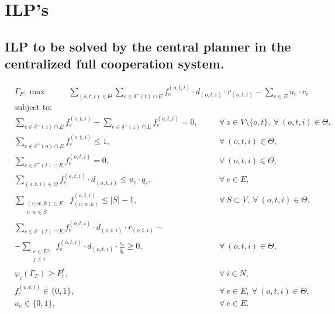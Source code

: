 \documentclass[review]{elsarticle}
\begin{document}


\appendix
\section{ILP's}
\label{seq:appendixilp}

\subsection{ILP to be solved by the central planner in the centralized full cooperation system.}

    \begin{align}
        &  \Gamma_F: \max  & \hspace{22pt} \sum_{(o,t,i)\in \Theta} \sum_{e \in \delta^-(t)\cap E}  f_e^{(o,t,i)} \cdot d_{(o,t,i)} \cdot r_{(o,t,i)} - \sum_{e\in E} u_{e}\cdot c_{e} \hspace{40pt} && 
    \end{align}
    \begin{align}
        & \text{subject to:}       && \nonumber \\
        & \sum_{e \in \delta^-(z)\cap E} f_e^{(o,t,i)} -\sum_{e \in \delta^+(z)\cap E} f_{e}^{(o,t,i)} = 0,\quad && \forall\ z\in V\setminus\{o,t\},\ \forall\ (o,t,i)\in\Theta, \\
& \sum_{e \in \delta^+(o)\cap E} f_e^{(o,t,i)} \leq 1, && \forall\ (o,t,i)\in \Theta, \\
 & \sum_{e \in \delta^+(t)\cap E} f_e^{(o,t,i)} = 0,  && \forall\ (o,t,i)\in \Theta,  \\
& \sum_{(o,t,i) \in \Theta} f_e^{(o,t,i)}\cdot d_{(o,t,i)}  \leq u_e\cdot q_e, && \forall\ e \in E,   \\
 & \sum_{\substack{(v,w,k) \in E\colon \\ v,w \in S}} f_{(v,w,k)}^{(o,t,i)} \leq |S| -1, && \forall\ S \subset V,\ \forall\ (o,t,i) \in \Theta,\\
&\sum_{e \in \delta^-(t)\cap E}  f_e^{(o,t,i)}  \cdot d_{(o,t,i)} \cdot r_{(o,t,i)} - && \nonumber\\
& -\sum_{\substack{e \in E^j\colon \\ j\not = i}} f_e^{(o,t,i)} \cdot d_{(o,t,i)} \cdot \frac{c_e}{q_e}\geq 0, && \forall\ (o,t,i) \in \Theta, \\
& \varphi_i(\Gamma_F) \geq P_i^*,  && \forall\ i\in N, \\
& f_e^{(o,t,i)} \in \{0,1\},  && \forall\ e \in E,\ \forall\ (o,t,i) \in \Theta,  \\
&  u_e  \in \{0,1\},  && \forall\ e \in E.
    \end{align}
\end{document}
